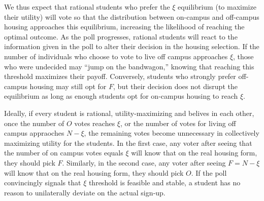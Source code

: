\documentclass[12pt]{article}
\begin{document}
We thus expect that rational students who prefer the $\xi$ equilibrium (to maximize their utility) will vote so that the distribution between on-campus and off-campus housing approaches this equilibrium, increasing the likelihood of reaching the optimal outcome. As the poll progresses, rational students will react to the information given in the poll to alter their decision in the housing selection. If the number of individuals who choose to vote to live off campus approaches $\xi$, those who were undecided may “jump on the bandwagon,” knowing that reaching this threshold maximizes their payoff. Conversely, students who strongly prefer off-campus housing may still opt for $F$, but their decision does not disrupt the equilibrium as long as enough students opt for on-campus housing to reach $\xi$. 


Ideally, if every student is rational, utility-maximizing and belives in each other, once the number of $O$ votes reaches $\xi$, or the number of votes for living off campus appraoches $N-\xi$, the remaining votes become unnecessary in collectively maximizing utility for the students. In the first case, any voter after seeing that the number of on campus votes equals $\xi$ will know that on the real housing form, they should pick $F$. Similarly, in the second case, any voter after seeing $F=N-\xi$ will know that on the real housing form, they should pick $O$. If the poll convincingly signals that $\xi$ threshold is feasible and stable, a student has no reason to unilaterally deviate on the actual sign‐up. 
\end{document}
